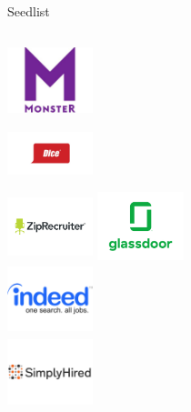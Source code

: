 \documentclass[9pt]{beamer}
\begin{document}
\begin{frame}{Seedlist}
  \begin{columns}[t]
    \centering
    \includegraphics[width=2.5cm,height=2cm]{img/monster.png}\\
    \includegraphics[width=2.5cm,height=2cm]{img/dice.jpg}\\
    \includegraphics[width=2.5cm,height=2cm]{img/ziprecruiter.png}
    \centering
    \includegraphics[width=2.5cm,height=2cm]{img/glassdoor.jpg}\\
    \includegraphics[width=2.5cm,height=2cm]{img/indeed.png}\\
    \includegraphics[width=2.5cm,height=2cm]{img/simplyhired.jpg}
  \end{columns}
\end{frame}

\end{document}
